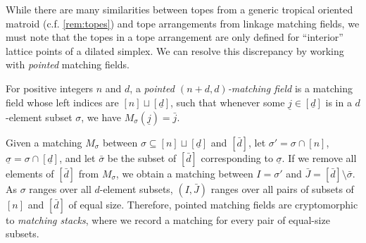 \documentclass[letterpaper,reqno,11pt]{amsart}
\begin{document}
While there are many similarities between topes from a generic tropical oriented matroid (c.f. \cref{rem:topes}) and tope arrangements from linkage matching fields, we must note that the topes in a tope arrangement are only defined for ``interior'' lattice points of a dilated simplex. We can resolve this discrepancy by working with \emph{pointed} matching fields.

\begin{definition}
    For positive integers $n$ and $d$, a \emph{pointed $(n+d, d)$-matching field} is a matching field whose left indices are $[n]\sqcup [\underline{d}]$, such that whenever some $\underline{j} \in [\underline{d}]$ is in a $d$-element subset $\sigma$, we have $M_\sigma(\underline{j}) = \bar{j}$.
\end{definition}

Given a matching $M_{\sigma}$ between $\sigma \subseteq [n]\sqcup [\underline{d}]$ and $[\bar{d}]$, let $\sigma' = \sigma\cap [n]$, $\underline{\sigma} = \sigma\cap[\underline{d}]$, and let $\bar{\sigma}$ be the subset of $[\bar{d}]$ corresponding to $\underline{\sigma}$. If we remove all elements of $[\bar{d}]$ from $M_{\sigma}$, we obtain a matching between $I = \sigma'$ and $\bar{J} = [\bar{d}]\setminus \bar{\sigma}$. As $\sigma$ ranges over all $d$-element subsets, $(I, \bar{J})$ ranges over all pairs of subsets of $[n]$ and $[\bar{d}]$ of equal size. Therefore, pointed matching fields are cryptomorphic to \emph{matching stacks}, where we record a matching for every pair of equal-size subsets. 
\end{document}
